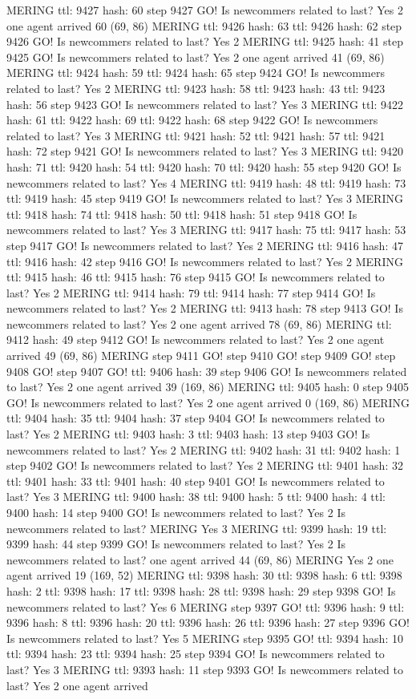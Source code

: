 MERING ttl: 9427 hash: 60 step 9427 GO! Is newcommers related to last? Yes 2 one agent arrived 60 (69, 86) MERING ttl: 9426 hash: 63 ttl: 9426 hash: 62 step 9426 GO! Is newcommers related to last? Yes 2 MERING ttl: 9425 hash: 41 step 9425 GO! Is newcommers related to last? Yes 2 one agent arrived 41 (69, 86) MERING ttl: 9424 hash: 59 ttl: 9424 hash: 65 step 9424 GO! Is newcommers related to last? Yes 2 MERING ttl: 9423 hash: 58 ttl: 9423 hash: 43 ttl: 9423 hash: 56 step 9423 GO! Is newcommers related to last? Yes 3 MERING ttl: 9422 hash: 61 ttl: 9422 hash: 69 ttl: 9422 hash: 68 step 9422 GO! Is newcommers related to last? Yes 3 MERING ttl: 9421 hash: 52 ttl: 9421 hash: 57 ttl: 9421 hash: 72 step 9421 GO! Is newcommers related to last? Yes 3 MERING ttl: 9420 hash: 71 ttl: 9420 hash: 54 ttl: 9420 hash: 70 ttl: 9420 hash: 55 step 9420 GO! Is newcommers related to last? Yes 4 MERING ttl: 9419 hash: 48 ttl: 9419 hash: 73 ttl: 9419 hash: 45 step 9419 GO! Is newcommers related to last? Yes 3 MERING ttl: 9418 hash: 74 ttl: 9418 hash: 50 ttl: 9418 hash: 51 step 9418 GO! Is newcommers related to last? Yes 3 MERING ttl: 9417 hash: 75 ttl: 9417 hash: 53 step 9417 GO! Is newcommers related to last? Yes 2 MERING ttl: 9416 hash: 47 ttl: 9416 hash: 42 step 9416 GO! Is newcommers related to last? Yes 2 MERING ttl: 9415 hash: 46 ttl: 9415 hash: 76 step 9415 GO! Is newcommers related to last? Yes 2 MERING ttl: 9414 hash: 79 ttl: 9414 hash: 77 step 9414 GO! Is newcommers related to last? Yes 2 MERING ttl: 9413 hash: 78 step 9413 GO! Is newcommers related to last? Yes 2 one agent arrived 78 (69, 86) MERING ttl: 9412 hash: 49 step 9412 GO! Is newcommers related to last? Yes 2 one agent arrived 49 (69, 86) MERING step 9411 GO! step 9410 GO! step 9409 GO! step 9408 GO! step 9407 GO! ttl: 9406 hash: 39 step 9406 GO! Is newcommers related to last? Yes 2 one agent arrived 39 (169, 86) MERING ttl: 9405 hash: 0 step 9405 GO! Is newcommers related to last? Yes 2 one agent arrived 0 (169, 86) MERING ttl: 9404 hash: 35 ttl: 9404 hash: 37 step 9404 GO! Is newcommers related to last? Yes 2 MERING ttl: 9403 hash: 3 ttl: 9403 hash: 13 step 9403 GO! Is newcommers related to last? Yes 2 MERING ttl: 9402 hash: 31 ttl: 9402 hash: 1 step 9402 GO! Is newcommers related to last? Yes 2 MERING ttl: 9401 hash: 32 ttl: 9401 hash: 33 ttl: 9401 hash: 40 step 9401 GO! Is newcommers related to last? Yes 3 MERING ttl: 9400 hash: 38 ttl: 9400 hash: 5 ttl: 9400 hash: 4 ttl: 9400 hash: 14 step 9400 GO! Is newcommers related to last? Yes 2 Is newcommers related to last? MERING Yes 3 MERING ttl: 9399 hash: 19 ttl: 9399 hash: 44 step 9399 GO! Is newcommers related to last? Yes 2 Is newcommers related to last? one agent arrived 44 (69, 86) MERING Yes 2 one agent arrived 19 (169, 52) MERING ttl: 9398 hash: 30 ttl: 9398 hash: 6 ttl: 9398 hash: 2 ttl: 9398 hash: 17 ttl: 9398 hash: 28 ttl: 9398 hash: 29 step 9398 GO! Is newcommers related to last? Yes 6 MERING step 9397 GO! ttl: 9396 hash: 9 ttl: 9396 hash: 8 ttl: 9396 hash: 20 ttl: 9396 hash: 26 ttl: 9396 hash: 27 step 9396 GO! Is newcommers related to last? Yes 5 MERING step 9395 GO! ttl: 9394 hash: 10 ttl: 9394 hash: 23 ttl: 9394 hash: 25 step 9394 GO! Is newcommers related to last? Yes 3 MERING ttl: 9393 hash: 11 step 9393 GO! Is newcommers related to last? Yes 2 one agent arrived 